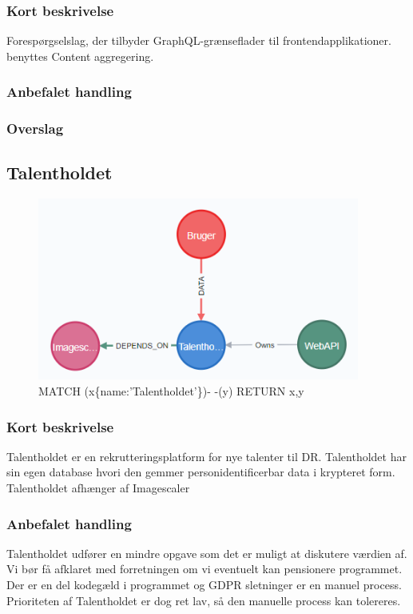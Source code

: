 \documentclass{article}
\begin{document}
\subsubsection{Kort beskrivelse}
Forespørgselslag, der tilbyder GraphQL-grænseflader til frontendapplikationer.
benyttes Content aggregering.
\subsubsection{Anbefalet handling}
\subsubsection{Overslag}


\subsection{Talentholdet}
\begin{figure}[h]
\includegraphics[width=300pt]{Talentholdet.PNG}
\caption{MATCH (x\{name:'Talentholdet'\})- -(y) RETURN x,y}
\end{figure}
\subsubsection{Kort beskrivelse}
Talentholdet er en rekrutteringsplatform for nye talenter til DR. Talentholdet har sin egen database hvori den gemmer personidentificerbar data i krypteret form. Talentholdet afhænger af Imagescaler
\subsubsection{Anbefalet handling}
Talentholdet udfører en mindre opgave som det er muligt at diskutere værdien af. Vi bør få afklaret med forretningen om vi eventuelt kan pensionere programmet. Der er en del kodegæld i programmet og GDPR sletninger er en manuel process.
Prioriteten af Talentholdet er dog ret lav, så den manuelle process kan tolereres.
\end{document}
